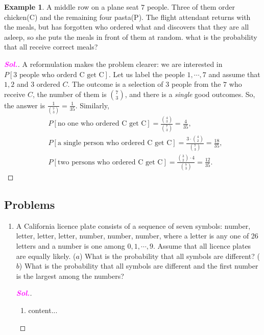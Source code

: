 \documentclass[12pt,a4paper]{article}
\theoremstyle{definition}
\newtheorem{example}{Example}[section]
\theoremstyle{definition}
\theoremstyle{definition}
\theoremstyle{definition}
\theoremstyle{remark}
\theoremstyle{definition}
\newcommand{\sol}{\textcolor{magenta}{\bf \textit{Sol.}}\quad}
\begin{document}
\begin{example}
	A middle row on a plane seat $7$ people. Three of them order chicken(C) and the remaining four pasta(P). The flight attendant returns with the meals, but has forgotten who ordered what and discovers that they are all asleep, so she puts the meals in front of them at random. what is the probability that all receive correct meals?
	\begin{proof}[\sol]
		A reformulation makes the problem clearer: we are interested in $P[\text{3 people who orderd C get C}]$. Let us label the people $1,\cdots,7$ and assume that $1,2$ and $3$ ordered $C$. The outcome is a selection of $3$ people from the $7$ who receive $C$, the number of them is $\binom{7}{3}$, and there is a \textit{single} good outcomes. So, the answer is $\frac{1}{\binom{7}{3}}=\frac{1}{35}$. Similarly, \begin{align*}
		&P[\text{no one who ordered C get C}]=\frac{\binom{4}{3}}{\binom{7}{3}}=\frac{4}{35},\\
		&P[\text{a single person who ordered C get C}]=\frac{3\cdot\binom{4}{2}}{\binom{7}{3}}=\frac{18}{35},\\
		&P[\text{two persons who ordered C get C}]=\frac{\binom{3}{2}\cdot4}{\binom{7}{3}}=\frac{12}{35}.
		\end{align*}
	\end{proof}
\end{example}

\subsection{Problems}
\begin{enumerate}[\bf 1.]
	\item A California licence plate consists of a sequence of seven symbols: number, letter, letter, letter, number, number, number, where a letter is any one of 26 letters and a number is one among $0,1,\cdots,9$. Assume that all licence plates are equally likely. ($a$) What is the probability that all symbols are different? ($b$) What is the probability that all symbols are different and the first number is the largest among the numbers?\begin{proof}[\sol]
		\ \begin{enumerate}[($a$)]
			\item content...
		\end{enumerate}
	\end{proof}
\end{enumerate}
\end{document}
